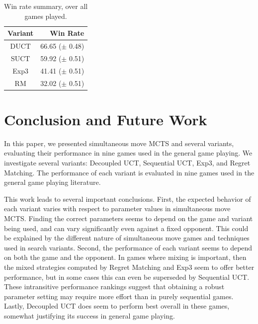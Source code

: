 \documentclass[conference]{IEEEtran}
\begin{document}
\begin{table}
\begin{center}
\begin{tabular}{|c|r|}
\hline
Variant     & Win Rate \\
\hline
      DUCT  &   66.65 ($\pm$ 0.48) \\
      SUCT  &   59.92 ($\pm$ 0.51) \\
      Exp3  &   41.41 ($\pm$ 0.51) \\
        RM  &   32.02 ($\pm$ 0.51) \\
\hline
\end{tabular}
\end{center}
\caption{Win rate summary, over all games played. \label{tbl:summary}}
\end{table}




\section{Conclusion and Future Work}
\label{sec:conc}

In this paper, we presented simultaneous move MCTS and several variants, evaluating their performance in nine games used in the general game playing. 
We investigate several variants: Decoupled UCT, Sequential UCT, Exp3, and Regret Matching. The performance of each variant is evaluated in nine 
games used in the general game playing literature.

This work leads to several important conclusions. 
First, the expected behavior of each variant varies with respect to parameter values in simultaneous move MCTS.
Finding the correct parameters seems to depend on the game and variant being used, and can vary 
significantly even against a fixed opponent. This could be explained by the different nature of simultaneous move games and techniques used 
in search variants. Second, the performance of each variant seems to depend on both the game and the opponent. In  games where mixing is 
important, then the mixed strategies computed by Regret Matching and Exp3 seem to offer better performance, but in some cases this 
can even be superseded by Sequential UCT. These intransitive performance rankings suggest that obtaining a robust parameter setting may require more 
effort than in purely sequential games. Lastly, Decoupled UCT does seem to perform best overall in these games, somewhat 
justifying its success in general game playing. 
\end{document}
